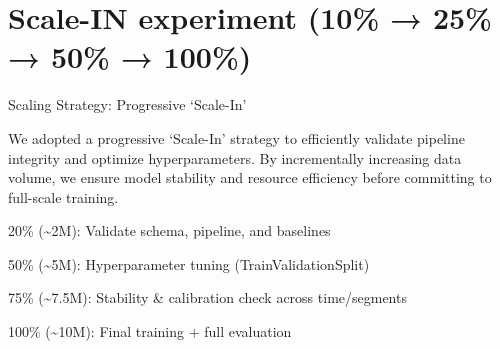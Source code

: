 \documentclass[11pt]{article}
\makeatletter
\newcommand{\boxspacing}{\kern\kvtcb@left@rule\kern\kvtcb@boxsep}
\newcommand{\prompt}[4]{
        {\ttfamily\llap{{\color{#2}[#3]:\hspace{3pt}#4}}\vspace{-\baselineskip}}
    }
\makeatother
\begin{document}
    \begin{tcolorbox}[breakable, size=fbox, boxrule=1pt, pad at break*=1mm,colback=cellbackground, colframe=cellborder]
\prompt{In}{incolor}{ }{\boxspacing}
\begin{Verbatim}[commandchars=\\\{\}]

\end{Verbatim}
\end{tcolorbox}

    \section{Scale-IN experiment (10\% → 25\% → 50\% →
100\%)}\label{scale-in-experiment-10-25-50-100}

    Scaling Strategy: Progressive `Scale-In'

We adopted a progressive `Scale-In' strategy to efficiently validate
pipeline integrity and optimize hyperparameters. By incrementally
increasing data volume, we ensure model stability and resource
efficiency before committing to full-scale training.

20\% (\textasciitilde2M): Validate schema, pipeline, and baselines

50\% (\textasciitilde5M): Hyperparameter tuning (TrainValidationSplit)

75\% (\textasciitilde7.5M): Stability \& calibration check across
time/segments

100\% (\textasciitilde10M): Final training + full evaluation
\end{document}
